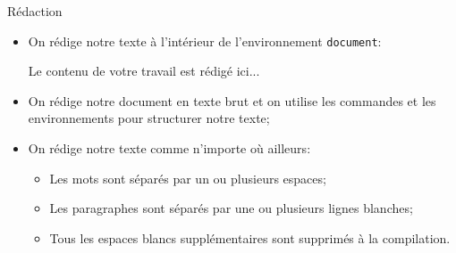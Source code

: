 \begin{frame}[fragile,c]{Rédaction}
	\begin{itemize}
		\item On rédige notre texte à l'intérieur de l'environnement \lstinline|document|:
\begin{codesource}
	
		Le contenu de votre travail est rédigé ici...
	
\end{codesource}
		\item On rédige notre document en texte brut et on utilise les commandes et les environnements
		pour structurer notre texte;
		\item On rédige notre texte comme n'importe où ailleurs:
			\begin{itemize}
				\item Les mots sont séparés par un ou plusieurs espaces;
				\item Les paragraphes sont séparés par une ou plusieurs lignes blanches;
				\item Tous les espaces blancs supplémentaires sont supprimés à la compilation.
			\end{itemize}
	\end{itemize}
\end{frame}

